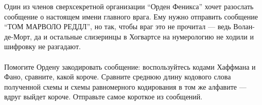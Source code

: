 \question
Один из членов сверхсекретной организации “Орден Феникса” хочет разослать сообщение о настоящем имени главного врага. Ему нужно отправить сообщение “ТОМ МАРВОЛО РЕДДЛ”, но так, чтобы враг это не прочитал — ведь Волан-де-Морт, да и остальные слизеринцы в Хогвартсе на нумерологию не ходили и шифровку не разгадают.
\\
\\
Помогите Ордену закодировать сообщение: воспользуйтесь кодами Хаффмана и Фано, сравните, какой короче. Сравните среднюю длину кодового слова полученной схемы и схемы равномерного кодирования в том же алфавите — вдруг выйдет короче. Отправьте самое короткое из сообщений.